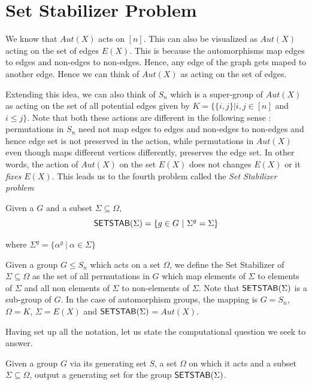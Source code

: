 \section{Set Stabilizer Problem}
We know that $Aut(X)$ acts on $[n]$. This can also be visualized as $Aut(X)$
acting on the set of edges $E(X)$. This is because the automorphisms map edges
to edges and non-edges to non-edges. Hence, any edge of the graph gets maped
to another edge. Hence we can think of $Aut(X)$ as acting on the set of
edges.

Extending this idea, we can also think of $S_n$ which is a
super-group of $Aut(X)$ as acting on the set of all potential edges given by
$K = \{ \{i, j\} | i, j \in [n]$ and $i \le j\}$. Note that both these actions
are different in the following sense : permutations in $S_n$ need not map
edges to edges and non-edges to non-edges and hence edge set is not preserved
in the action, while permutations in $Aut(X)$ even
though maps different vertices differently, preserves the edge set. In other
words, the action of $Aut(X)$ on the set $E(X)$ does not changes $E(X)$ or it
\emph{fixes} $E(X)$. This leads us to the fourth problem called the \emph{Set
Stabilizer problem}

\begin{definition}
	Given a $G$ and a subset $\Sigma \subseteq \Omega$, 
	\[ 	{\sf SETSTAB}(\Sigma) = \{ g \in G ~|~ \Sigma^{g} = \Sigma\} \]

	where $\Sigma^g = \{ \alpha^g ~|~ \alpha \in \Sigma \}$
\end{definition}

Given a group $G \le S_n$ which acts on a set $\Omega$, we define the Set
Stabilizer of $\Sigma \subseteq \Omega$ as the set of all permutations in $G$
which map elements of $\Sigma$ to elements of $\Sigma$ and all non elements of
$\Sigma$ to non-elements of $\Sigma$. Note that ${\sf SETSTAB}(\Sigma)$ is a
sub-group of $G$. In the case of automorphism groups, the mapping is $G =
S_n$, $\Omega = K$, $\Sigma = E(X)$ and
${\sf SETSTAB}(\Sigma)$$=$$Aut(X)$.

Having set up all the notation, let us state the computational question we
seek to answer.
\begin{problem}
Given a group $G$ via its generating set $S$, a set $\Omega$ on
which it acts and a subset $\Sigma \subseteq \Omega$, output a generating set
for the group ${\sf SETSTAB}(\Sigma)$.
\end{problem}

